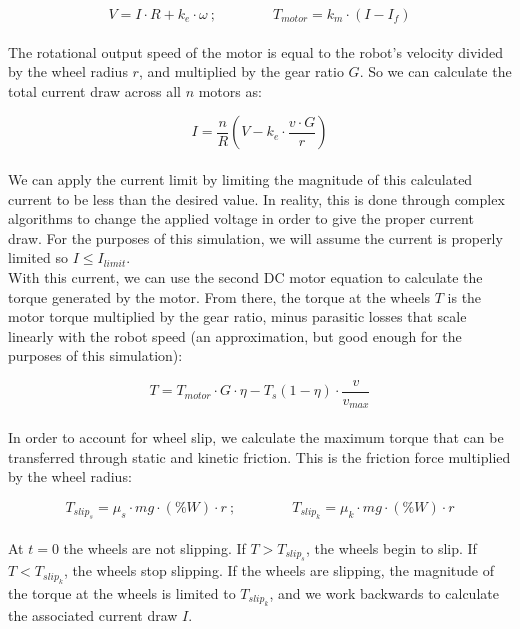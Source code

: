 \documentclass[a4paper]{article}
\begin{document}
	\begin{equation}
		V = I \cdot R + k_e \cdot \omega\ ; \qquad\qquad
		T_{motor} = k_m \cdot \left( I - I_f \right)
	\end{equation}
	\\
	The rotational output speed of the motor is equal to the robot's velocity divided by the wheel radius $ r $, and multiplied by the gear ratio $ G $. So we can calculate the total current draw across all $ n $ motors as:
	
	\begin{equation}
		I = \frac{n}{R} \left( V - k_e \cdot \frac{v \cdot G}{r} \right)
	\end{equation}
	\\
	We can apply the current limit by limiting the magnitude of this calculated current to be less than the desired value. In reality, this is done through complex algorithms to change the applied voltage in order to give the proper current draw. For the purposes of this simulation, we will assume the current is properly limited so $ I \leq I_{limit} $.\\
	
	With this current, we can use the second DC motor equation to calculate the torque generated by the motor. From there, the torque at the wheels $ T $ is the motor torque multiplied by the gear ratio, minus parasitic losses that scale linearly with the robot speed (an approximation, but good enough for the purposes of this simulation):
	
	\begin{equation}
		T = T_{motor} \cdot G \cdot \eta - T_s \left( 1 - \eta \right) \cdot \frac{v}{v_{max}}
	\end{equation}
	\\
	In order to account for wheel slip, we calculate the maximum torque that can be transferred through static and kinetic friction. This is the friction force multiplied by the wheel radius:
	
	\begin{equation}
		T_{slip_s} = \mu_s \cdot mg \cdot \left( \% W \right) \cdot r\ ; \qquad\qquad
		T_{slip_k} = \mu_k \cdot mg \cdot \left( \% W \right) \cdot r
	\end{equation}
	\\
	At $ t=0 $ the wheels are not slipping. If $ T > T_{slip_s} $, the wheels begin to slip. If $ T < T_{slip_k} $, the wheels stop slipping. If the wheels are slipping, the magnitude of the torque at the wheels is limited to $ T_{slip_k} $, and we work backwards to calculate the associated current draw $ I $.\\
	
\end{document}
